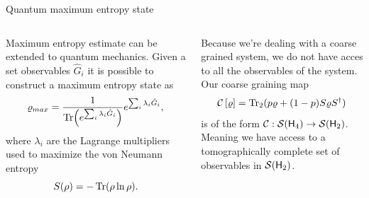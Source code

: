 \documentclass{cubeamer}
\newcommand{\mcS}{\mathcal{S}}
\newcommand{\hilbert}{{\sf H}}
\newcommand{\mcC}{\mathcal{C}}
\newcommand{\CG}[1]{\mcC\left[#1\right]}
\begin{document}
\begin{frame}{Quantum maximum entropy state}
    \begin{columns}
        \begin{column}{0.5\textwidth}
            Maximum entropy estimate can be extended to quantum mechanics. Given a set observables $\hat{G}_{i}$ it is possible to construct a maximum entropy state as
            \begin{equation*}
                \varrho_{max}=\frac{1}{\Tr(e^{\sum_{i}\lambda_{i}\hat{G}_{i}})}e^{\sum_{i}\lambda_{i}\hat{G}_{i}},
            \end{equation*}
            where $\lambda_{i}$ are the Lagrange multipliers used to maximize the von Neumann entropy
            \begin{equation*}
                S(\rho)=-\Tr(\rho\ln{\rho}).
            \end{equation*}
        \end{column}
        \begin{column}{0.5\textwidth}
            Because we're dealing with a coarse grained system, we do not have acces to all the observables of the system. Our coarse graining map
            \begin{equation*}
                \CG{\varrho}=\Tr_{2}(p\varrho+(1-p)S\varrho S^{\dag})
            \end{equation*}
            is of the form $\mcC:\mcS(\hilbert_{4})\rightarrow\mcS(\hilbert_{2})$. Meaning we have access to a tomographically complete set of observables in $\mcS(\hilbert_{2})$. 
        \end{column}
    \end{columns}
\end{frame}
\end{document}
